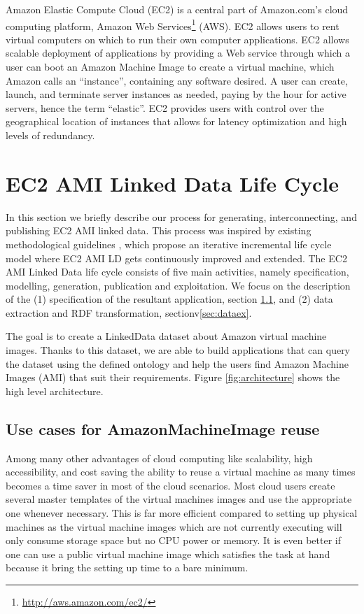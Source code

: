 Amazon Elastic Compute Cloud (EC2) is a central part of Amazon.com's cloud computing platform, Amazon Web Services\footnote{\url{http://aws.amazon.com/ec2/}} (AWS). EC2 allows users to rent virtual computers on which to run their own computer applications. EC2 allows scalable deployment of applications by providing a Web service through which a user can boot an Amazon Machine Image to create a virtual machine, which Amazon calls an ``instance'', containing any software desired. A user can create, launch, and terminate server instances as needed, paying by the hour for active servers, hence the term ``elastic''. EC2 provides users with control over the geographical location of instances that allows for latency optimization and high levels of redundancy.

\section{EC2 AMI Linked Data Life Cycle}\label{sec:process}
In this section we briefly describe our process for generating, interconnecting, and publishing EC2 AMI linked data. This process was inspired by existing methodological guidelines \cite{VillazonTerrazas_2011}, which propose an iterative incremental life cycle model where EC2 AMI LD gets
continuously improved and extended.  The EC2 AMI Linked Data life cycle consists of five main activities, namely specification, modelling, generation, publication and exploitation. We focus on the description of the (1) specification of the resultant application, section \ref{sec:usecase}, and (2) data extraction and RDF transformation, sectionv\ref{sec:dataex}.

The goal is to create a LinkedData dataset about Amazon virtual machine images. Thanks to this dataset, we are able to build applications that can query the dataset using the defined ontology and help the users find Amazon Machine Images (AMI) that suit their requirements. Figure \ref{fig:architecture} shows the high level architecture.

\subsection{Use cases for AmazonMachineImage reuse}\label{sec:usecase}
Among many other advantages of cloud computing like scalability, high accessibility, and cost saving the ability to reuse a virtual machine as many times becomes a time saver in most of the cloud scenarios. Most cloud users create several master templates of the virtual machines images and use the appropriate one whenever necessary. This is far more efficient compared to setting up physical machines as the virtual machine images which are not currently executing will only consume storage space but no CPU power or memory. It is even better if one can use a public virtual machine image which satisfies the task at hand because it bring the setting up time to a bare minimum. 


